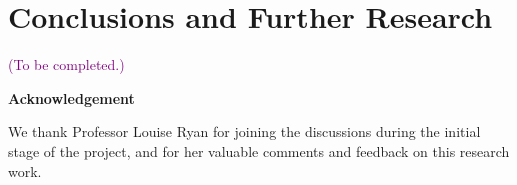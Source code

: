 \documentclass[11pt,a4paper,]{article}
\begin{document}
\hypertarget{sec-conclusion}{%
\section{Conclusions and Further Research}\label{sec-conclusion}}

\textcolor{purple}{(To be completed.)} \newline

\textbf{\large{Acknowledgement}}

We thank Professor Louise Ryan for joining the discussions during the
initial stage of the project, and for her valuable comments and feedback
on this research work.

\printbibliography
\end{document}
